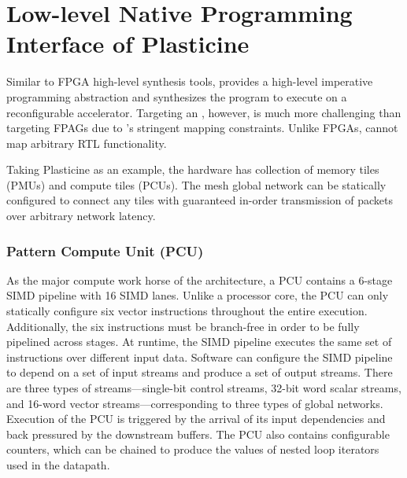 \section{Low-level Native Programming Interface of Plasticine}
Similar to FPGA high-level synthesis tools, \name provides a high-level imperative programming
abstraction and synthesizes the program to execute on a reconfigurable accelerator. Targeting an \rda, however,
is much more challenging than targeting FPAGs due to \rda's stringent mapping constraints. 
Unlike FPGAs, \rdas cannot map arbitrary RTL functionality. 

Taking Plasticine as an example, 
the hardware has collection of memory tiles (PMUs) and compute tiles (PCUs). 
The mesh global network can be statically configured to connect any tiles with guaranteed in-order 
transmission of packets over arbitrary network latency.

\subsubsection{Pattern Compute Unit (PCU)}
As the major compute work horse of the architecture, a PCU contains a 6-stage SIMD pipeline with 16 SIMD lanes. 
Unlike a processor core, the PCU can only statically configure six vector instructions throughout the
entire execution.
Additionally, the six instructions must be branch-free in order to be fully pipelined across stages.
At runtime, the SIMD pipeline executes the same set of instructions over different input data.
Software can configure the SIMD pipeline to depend on a set of input streams and
produce a set of output streams. 
There are three types of streams---single-bit control streams, 32-bit word scalar streams, and
16-word vector streams---corresponding to three types of global networks.
Execution of the PCU is triggered by the arrival of its input dependencies and back pressured by
the downstream buffers.
The PCU also contains configurable counters, which can be chained to produce the values of nested
loop iterators used in the datapath. 

